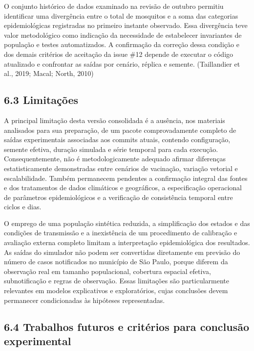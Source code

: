 O conjunto histórico de dados examinado na revisão de outubro permitiu
identificar uma divergência entre o total de mosquitos e a soma das
categorias epidemiológicas registradas no primeiro instante observado.
Essa divergência teve valor metodológico como indicação da necessidade
de estabelecer invariantes de população e testes automatizados. A
confirmação da correção dessa condição e dos demais critérios de
aceitação da issue \#12 depende de executar o código atualizado e
confrontar as saídas por cenário, réplica e semente. (Taillandier et
al., 2019; Macal; North, 2010)

\subsection{6.3 Limitações}\label{limitauxe7uxf5es}

A principal limitação desta versão consolidada é a ausência, nos
materiais analisados para sua preparação, de um pacote comprovadamente
completo de saídas experimentais associadas aos commits atuais, contendo
configuração, semente efetiva, duração simulada e série temporal para
cada execução. Consequentemente, não é metodologicamente adequado
afirmar diferenças estatisticamente demonstradas entre cenários de
vacinação, variação vetorial e escalabilidade. Também permanecem
pendentes a confirmação integral das fontes e dos tratamentos de dados
climáticos e geográficos, a especificação operacional de parâmetros
epidemiológicos e a verificação de consistência temporal entre ciclos e
dias.

O emprego de uma população sintética reduzida, a simplificação dos
estados e das condições de transmissão e a inexistência de um
procedimento de calibração e avaliação externa completo limitam a
interpretação epidemiológica dos resultados. As saídas do simulador não
podem ser convertidas diretamente em previsão do número de casos
notificados no município de São Paulo, porque diferem da observação real
em tamanho populacional, cobertura espacial efetiva, subnotificação e
regras de observação. Essas limitações são particularmente relevantes em
modelos explicativos e exploratórios, cujas conclusões devem permanecer
condicionadas às hipóteses representadas.

\subsection{6.4 Trabalhos futuros e critérios para conclusão
experimental}\label{trabalhos-futuros-e-crituxe9rios-para-conclusuxe3o-experimental}

